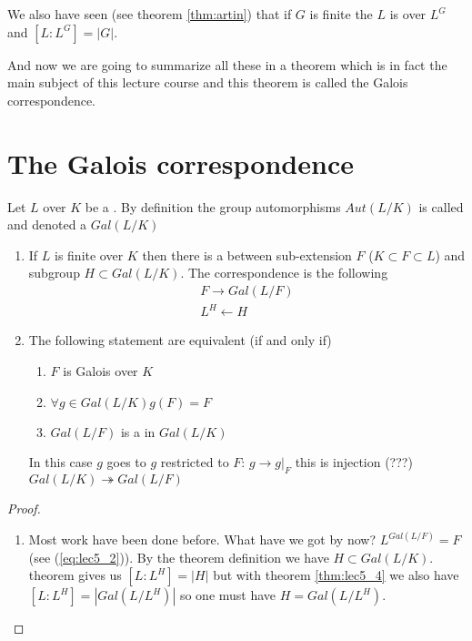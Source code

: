 We also have seen (see theorem \ref{thm:artin}) that if $G$ is finite
the $L$ is  over $L^G$ and
$\left[L:L^G\right] = \left|G\right|$.

And now we are going to summarize all these in a theorem which is in
fact the main subject of this lecture course and this theorem is
called the Galois correspondence. 

\section{The Galois correspondence}

Let $L$ over $K$ be a . By definition the
group automorphisms $Aut\left(L/K\right)$ is called
 and denoted a $Gal\left(L/K\right)$
\begin{theorem}
  \begin{enumerate}
  \item If $L$ is finite over $K$ then there is a
     between sub-extension $F$
    ($K \subset F \subset L$) and subgroup $H \subset
    Gal\left(L/K\right)$. The correspondence is the following
    \begin{eqnarray}
      F \rightarrow Gal\left(L/F\right)
      \nonumber \\
      L^H \leftarrow H
      \nonumber
    \end{eqnarray}
  \item The following statement are equivalent (if and only if)
    \begin{enumerate}
    \item $F$ is Galois over $K$
    \item $\forall g \in Gal\left(L/K\right) g\left(F\right) = F$
    \item $Gal\left(L/F\right)$ is a  in
      $Gal\left(L/K\right)$ 
    \end{enumerate}
    In this case  $g$ goes to $g$ restricted to $F$: $g \to
    \left.g\right|_F$ this is injection (???)
    $Gal\left(L/K\right) \twoheadrightarrow Gal\left(L/F\right)$
  \end{enumerate}
  \begin{proof}
    \begin{enumerate}
    \item Most work have been done before. What have we got by now?
      $L^{Gal\left(L/F\right)} = F$ (see (\ref{eq:lec5_2})). By
      the theorem definition we have $H \subset Gal\left(L/K\right)$.
       theorem gives us
      $\left[L:L^H\right] = \left|H\right|$ but with theorem
      \ref{thm:lec5_4} we also have
      $\left[L:L^H\right] = \left|Gal\left(L/L^H\right)\right|$ so one
      must have $H = Gal\left(L/L^H\right)$.


\end{enumerate}
\end{proof}
\end{theorem}
